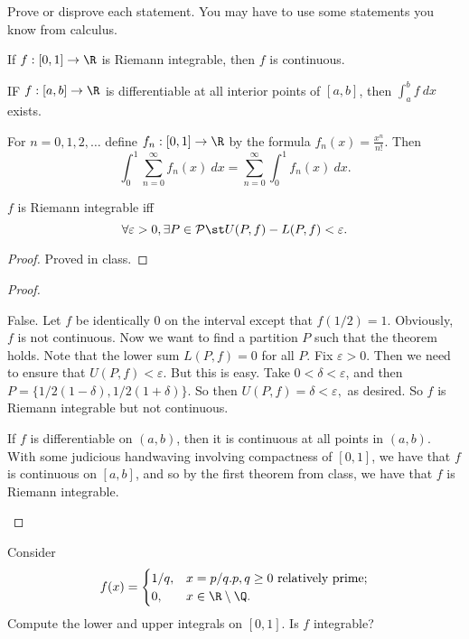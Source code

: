 \documentclass{assignment}
\begin{document}
\begin{question}[2]
  Prove or disprove each statement. You may have to use some statements you know from calculus.
\begin{qparts}
  \item If $f:[0,1] \to \R$ is Riemann integrable, then $f$ is continuous.
  \item IF $f:[a,b]\to\R$ is differentiable at all interior points of $[a,b]$, then $\int_a^b f\ dx$
exists.
  \item For $n = 0, 1, 2, \dots$ define $f_n: [0,1]\to \R$ by the formula $f_n(x) = \frac{x^n}{n!}$.
Then $$\int_0^1 \sum_{n=0}^\infty f_n(x)\ dx = \sum_{n=0}^\infty \int_0^1  f_n(x)\ dx.$$
\end{qparts}
\end{question}
\begin{theorem}
  $f$ is Riemann integrable iff 
  $$\forall \varepsilon > 0, \exists P\in \mathcal{P} \st U(P,f) - L(P,f) < \varepsilon.$$
\end{theorem}
\begin{proof}
  Proved in class.
\end{proof}
\begin{proof}\leavevmode
  \begin{qparts}
   \item False. Let $f$ be identically 0 on the interval except that $f(1/2) = 1$. Obviously, $f$
is not continuous. Now we want to find a partition $P$ such that the theorem holds. Note that the
lower sum $L(P, f) = 0$ for all $P$. Fix $\varepsilon > 0$. Then we need to ensure that $U(P,f) <
\varepsilon$. But this is easy. Take $0 < \delta < \varepsilon$, and then $P = \{1/2(1  - \delta),
1/2(1  + \delta) \}$. So then $U(P,f) = \delta < \varepsilon,$ as desired. So $f$ is Riemann
integrable but not continuous.
   \item If $f$ is differentiable on $(a,b)$, then it is continuous at all points in $(a,b)$.
With some judicious handwaving involving compactness of $[0,1]$, we have that $f$ is continuous on
$[a,b]$, and so by the first theorem from class, we have that $f$ is Riemann integrable.
  \end{qparts}
\end{proof}

\begin{question}[3]
  Consider $$f(x) = \begin{cases} 1/q, &x = p/q. p, q \geq 0 \text{ relatively prime;} \\
                                  0, &x \in \R \setminus \Q. \end{cases}$$
  Compute the lower and upper integrals on $[0,1]$. Is $f$ integrable? 
\end{question}
\end{document}
